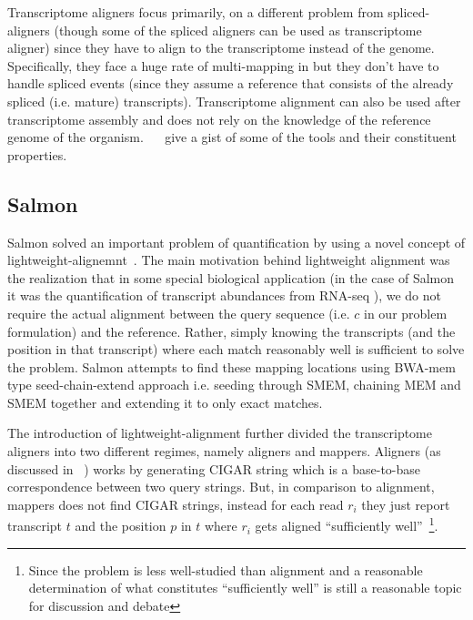 Transcriptome aligners focus primarily, on a different problem from spliced-aligners (though some of the spliced aligners can be used as transcriptome aligner) since they have to align \reads to the transcriptome instead of the genome. Specifically, they face a huge rate of multi-mapping in \reads but they don't have to handle spliced events (since they assume a reference that consists of the already spliced (i.e. mature) transcripts). Transcriptome alignment can also be used after \denovo transcriptome assembly and does not rely on the knowledge of the reference genome of the organism. ~~\citep{li2010survey} give a gist of some of the tools and their constituent properties.

\subsection{Salmon~\citep{patro2015salmon}} \label{salmon}

Salmon solved an important problem of quantification by using a novel concept of lightweight-alignemnt~\citep{patro2015salmon}. The main motivation behind lightweight alignment was the realization that in some special biological application (in the case of Salmon it was the quantification of transcript abundances from RNA-seq \reads), we do not require the actual alignment between the query sequence (i.e. $c$ in our problem formulation) and the reference. Rather, simply knowing the transcripts (and the position in that transcript) where each match reasonably well is sufficient to solve the problem. Salmon attempts to find these mapping locations using BWA-mem type seed-chain-extend approach i.e. seeding through SMEM, chaining MEM and SMEM together and extending it to only exact matches.

The introduction of lightweight-alignment further divided the transcriptome aligners into two different regimes, namely aligners and mappers. Aligners (as discussed in ~) works by generating CIGAR string which is a base-to-base correspondence between two query strings. But, in comparison to alignment, mappers does not find CIGAR strings, instead for each read $r_i$ they just report transcript $t$ and the position $p$ in $t$ where $r_i$ gets aligned “sufficiently well”~\citep{blog}\footnote{Since the problem is less well-studied than alignment and a reasonable determination of what constitutes “sufficiently well” is still a reasonable topic for discussion and debate}.

